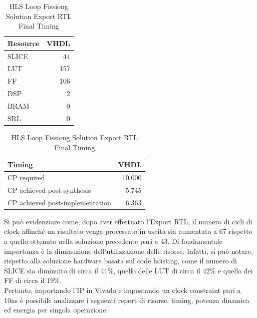 \begin{table}[H]
    \centering
    \begin{minipage}[t]{0.45\linewidth}
        \centering
        \begin{tabular}{|l|r|}
            \hline
            \textbf{Resource} & \textbf{VHDL} \\
            \hline
            SLICE & 44 \\
            \hline
            LUT & 157 \\
            \hline
            FF & 106 \\
            \hline
            DSP & 2 \\
            \hline
            BRAM & 0 \\
            \hline
            SRL & 0 \\
            \hline
        \end{tabular}
        \caption{HLS Loop Fissiong Solution Export RTL Resource Usage}
        \label{tab:hls-loop-fission-solution-export-rtl-resoruce-usage}
    \end{minipage}
    \hfill
    \begin{minipage}[t]{0.45\linewidth}
        \centering
        \begin{tabular}{|l|r|}
            \hline
            \textbf{Timing} & \textbf{VHDL} \\
            \hline
            CP required & 10.000 \\
            \hline
            CP achieved post-synthesis & 5.745 \\
            \hline
            CP achieved post-implementation & 6.363 \\
            \hline
        \end{tabular}
        \caption{HLS Loop Fissiong Solution Export RTL Final Timing}
        \label{tab:hls-loop-fission-solution-export-rtl-final-timing}
    \end{minipage}
\end{table}

Si può evidenziare come, dopo aver effettuato l'Export RTL, il numero di cicli di clock affinché un risultato venga processato in uscita sia aumentato a 67 rispetto a quello ottenuto nella soluzione precedente pari a 43. Di fondamentale importanza è la diminuzione dell'utilizzazione delle risorse. Infatti, si può notare, rispetto alla soluzione hardware basata sul code hoisting, come il numero di SLICE sia diminuito di circa il $41\%$, quello delle LUT di circa il $42\%$ e quello dei FF di circa il $19\%$.
\\
Pertanto, importando l'IP in Vivado e impostando un clock constraint pari a 10ns è possibile analizzare i seguenti report di risorse, timing, potenza dinamica ed energia per singola operazione.



